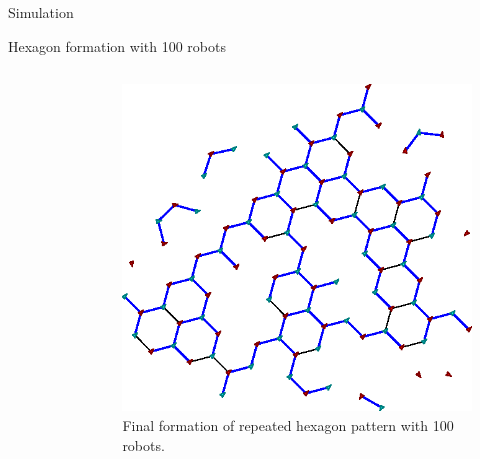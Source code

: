 \documentclass[10pt]{beamer}
\begin{document}
\begin{frame}{Simulation}{}
\begin{block}{Hexagon formation with 100 robots}
\begin{columns}[T]
\begin{column}{.5\textwidth}
\begin{figure}
        \end{figure}
      \end{column}%
      \begin{column}{.5\textwidth}   
        \begin{figure}
            \centering
            \includegraphics[width=.9\linewidth]{figs/formation-100}
            \caption{Final formation of repeated hexagon pattern with
            100 robots.}
        \end{figure}
      \end{column}%
    \end{columns}
  \end{block}
\end{frame}
\end{document}
